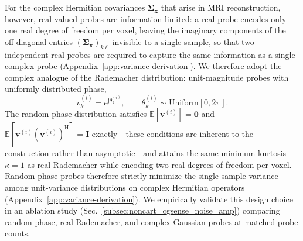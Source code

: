 \documentclass[AMA,STIX2COL,Linenumberson]{MRM}
\begin{document}
For the complex Hermitian covariances $\boldsymbol{\Sigma}_{\hat{\mathbf{x}}}$ that arise in MRI reconstruction, however, real-valued probes are information-limited: a real probe encodes only one real degree of freedom per voxel, leaving the imaginary components of the off-diagonal entries $(\boldsymbol{\Sigma}_{\hat{\mathbf{x}}})_{k\ell}$ invisible to a single sample, so that two independent real probes are required to capture the same information as a single complex probe (Appendix~\ref{app:variance-derivation}). We therefore adopt the complex analogue of the Rademacher distribution: unit-magnitude probes with uniformly distributed phase,
\begin{equation}
v_k^{(i)} = e^{\mathrm{j}\theta_k^{(i)}}, \qquad \theta_k^{(i)} \sim \mathrm{Uniform}[0, 2\pi].
\label{eq:complex_rademacher}
\end{equation}
The random-phase distribution satisfies $\mathbb{E}[\mathbf{v}^{(i)}] = \mathbf{0}$ and $\mathbb{E}[\mathbf{v}^{(i)}(\mathbf{v}^{(i)})^{\mathrm{H}}] = \mathbf{I}$ exactly---these conditions are inherent to the construction rather than asymptotic---and attains the same minimum kurtosis $\kappa = 1$ as real Rademacher while encoding two real degrees of freedom per voxel. Random-phase probes therefore strictly minimize the single-sample variance among unit-variance distributions on complex Hermitian operators (Appendix~\ref{app:variance-derivation}). We empirically validate this design choice in an ablation study (Sec.~\ref{subsec:noncart_cgsense_noise_amp}) comparing random-phase, real Rademacher, and complex Gaussian probes at matched probe counts.
\end{document}
